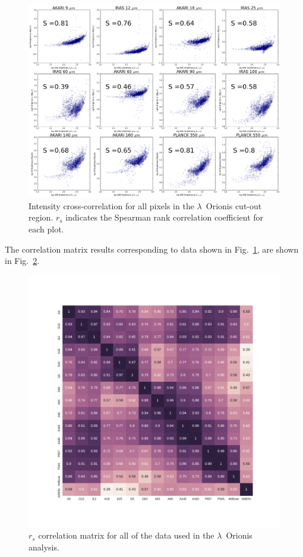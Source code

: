         \begin{figure}
          \includegraphics[width=\textwidth]{../Plots/orionis_correlations_AME.png}
          \centering
          \caption{Intensity cross-correlation for all pixels in the $\lambda$~Orionis cut-out region.  $r_{s}$ indicates the Spearman rank correlation coefficient for each plot.}
          \label{fig:orionis-corr}
        \end{figure}
    The correlation matrix results corresponding to data shown in Fig.~\ref{fig:orionis-corr}, are shown in Fig.~\ref{fig:orionis-corr-matrix}.
        \begin{figure}
          \includegraphics[width=\textwidth]{../Plots/ch_lori/Lori_corrmatrix_I.pdf}
          \centering
          \caption{$r_{s}$ correlation matrix for all of the data used in the $\lambda$~Orionis analysis.}
          \label{fig:orionis-corr-matrix}
        \end{figure}
